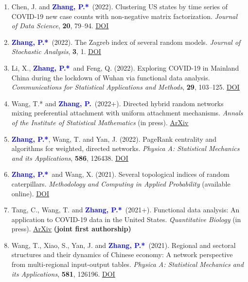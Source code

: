 \documentclass{res}
\newcommand{\PZ}{\textbf{\textcolor{blue}{Zhang, P.*}}}
\newcommand{\PZnot}{\textbf{\textcolor{blue}{Zhang, P.}}}
\begin{document}
\begin{resume}
\begin{enumerate}
	\item {\sc Chen, J.} and \PZ\ (2022). Clustering US states by 
	time series of COVID-19 new case counts with non-negative matrix 
	factorization. {\em Journal of Data Science}, {\bf 20}, 79--94.
	\href{https://doi.org/10.6339/22-JDS1036}{\underline{DOI}}
	
	\item \PZ\ (2022). The Zagreb index of several random models. 
	{\em Journal of Stochastic Analysis}, {\bf 3}, 1. 
	\href{https://doi.org/10.31390/josa.3.1.01}{\underline{DOI}}
	
	\item {\sc Li, X.}, \PZ\ and {\sc Feng, Q.} (2022). Exploring 
	COVID-19 in Mainland China during the lockdown of Wuhan via 
	functional data analysis. {\em Communications for Statistical 
	Applications and Methods}, {\bf 29}, 103--125. 
	\href{https://doi.org/10.29220/CSAM.2022.29.1.103}
	{\underline{DOI}}
	
	\item {\sc Wang, T.*} and \PZnot\ (2022+). Directed 
	hybrid random networks mixing preferential attachment with 
	uniform attachment mechanisms. {\em Annals of the Institute of 
	Statistical Mathematics} (in press). 
	\href{https://arxiv.org/pdf/2101.04611.pdf}{\underline{ArXiv}}
	
	\item \PZ, {\sc Wang, T.} and {\sc Yan, J.} (2022). PageRank 
	centrality and algorithms for weighted, directed networks. {\em 
	Physica A: Statistical Mechanics and its Applications}, {\bf 
	586}, 126438. 
	\href{https://doi.org/10.1016/j.physa.2021.126438}
	{\underline{DOI}}
	
	\item \PZ\ and {\sc Wang, X.} (2021). Several 
	topological indices of random caterpillars. 
	{\em Methodology and Computing in Applied Probability} 
	(available online). 
	\href{https://doi.org/10.1007/s11009-021-09895-1}
	{\underline{DOI}} 
	
	\item {\sc Tang, C., Wang, T.} and \PZ\ (2021+). 
	Functional data analysis: An application to COVID-19 data in
	the United States. {\em Quantitative Biology} (in press).
	\href{https://arxiv.org/pdf/2009.08363.pdf}
	{\underline{ArXiv}} {\bf \small (joint first authorship)}
	
	\item {\sc Wang, T., Xiao, S., Yan, J.} and \PZ\ 
	(2021). Regional and sectoral structures and their dynamics of
	Chinese economy: A network perspective from
	multi-regional input-output tables. {\em Physica A: Statistical 
	Mechanics and its Applications}, {\bf 581}, 126196.
	\href{https://doi.org/10.1016/j.physa.2021.126196}
	{\underline{DOI}}
	

\end{enumerate}
\end{resume}
\end{document}
